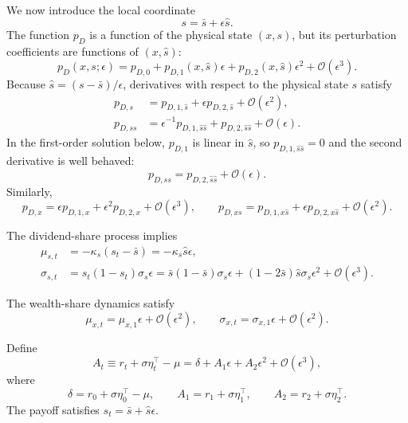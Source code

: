 We now introduce the local coordinate
\begin{equation}
    s=\bar{s}+\epsilon\hat{s}.
\end{equation}
The function $p_D$ is a function of the physical state $(x,s)$, but its perturbation coefficients are functions of $(x,\hat{s})$:
\begin{equation}\label{eq:pD-expansion-local-s}
    p_D(x,s;\epsilon)
    = p_{D,0}+p_{D,1}(x,\hat{s})\epsilon+p_{D,2}(x,\hat{s})\epsilon^2
    +\mathcal{O}(\epsilon^3).
\end{equation}
Because $\hat{s}=(s-\bar{s})/\epsilon$, derivatives with respect to the physical state $s$ satisfy
\begin{align}
    p_{D,s}
    &= p_{D,1,\hat{s}}+\epsilon p_{D,2,\hat{s}}+\mathcal{O}(\epsilon^2),\\
    p_{D,ss}
    &= \epsilon^{-1}p_{D,1,\hat{s}\hat{s}}+p_{D,2,\hat{s}\hat{s}}+\mathcal{O}(\epsilon).
\end{align}
In the first-order solution below, $p_{D,1}$ is linear in $\hat{s}$, so $p_{D,1,\hat{s}\hat{s}}=0$ and the second derivative is well behaved:
\begin{equation}
    p_{D,ss}=p_{D,2,\hat{s}\hat{s}}+\mathcal{O}(\epsilon).
\end{equation}
Similarly,
\begin{equation}
    p_{D,x}=\epsilon p_{D,1,x}+\epsilon^2p_{D,2,x}+\mathcal{O}(\epsilon^3),
    \qquad
    p_{D,xs}=p_{D,1,x\hat{s}}+\epsilon p_{D,2,x\hat{s}}+\mathcal{O}(\epsilon^2).
\end{equation}

The dividend-share process implies
\begin{align}
    \mu_{s,t} &= -\kappa_s(s_t-\bar{s}) = -\kappa_s\hat{s}\epsilon,\\
    \sigma_{s,t} &= s_t(1-s_t)\sigma_s\epsilon 
    = \bar{s}(1-\bar{s})\sigma_s\epsilon
    +(1-2\bar{s})\hat{s}\sigma_s\epsilon^2
    +\mathcal{O}(\epsilon^3).
\end{align}

The wealth-share dynamics satisfy
\begin{equation}
    \mu_{x,t}=\mu_{x,1}\epsilon+\mathcal{O}(\epsilon^2),
    \qquad
    \sigma_{x,t}=\sigma_{x,1}\epsilon+\mathcal{O}(\epsilon^2).
\end{equation}

Define
\begin{equation}
    A_t\equiv r_t+\sigma\eta_t^\top-\mu
    =\delta+A_1\epsilon+A_2\epsilon^2+\mathcal{O}(\epsilon^3),
\end{equation}
where
\begin{equation}
    \delta=r_0+\sigma\eta_0^\top-\mu,
    \qquad
    A_1=r_1+\sigma\eta_1^\top,
    \qquad
    A_2=r_2+\sigma\eta_2^\top.
\end{equation}
The payoff satisfies $s_t=\bar{s}+\hat{s}\epsilon$.

